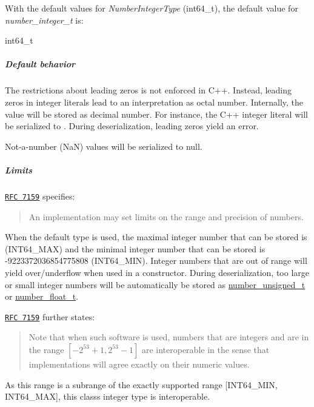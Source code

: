 With the default values for {\itshape Number\+Integer\+Type} ({\ttfamily int64\+\_\+t}), the default value for {\itshape number\+\_\+integer\+\_\+t} is\+:


\begin{DoxyCode}
int64\_t
\end{DoxyCode}


\subparagraph*{Default behavior}


\begin{DoxyItemize}
\item The restrictions about leading zeros is not enforced in C++. Instead, leading zeros in integer literals lead to an interpretation as octal number. Internally, the value will be stored as decimal number. For instance, the C++ integer literal {} will be serialized to {}. During deserialization, leading zeros yield an error.
\item Not-\/a-\/number (NaN) values will be serialized to {\ttfamily null}.
\end{DoxyItemize}

\subparagraph*{Limits}

\href{http://rfc7159.net/rfc7159}{\tt R\+FC 7159} specifies\+: \begin{quote}
An implementation may set limits on the range and precision of numbers. \end{quote}


When the default type is used, the maximal integer number that can be stored is {} (I\+N\+T64\+\_\+\+M\+AX) and the minimal integer number that can be stored is {\ttfamily -\/9223372036854775808} (I\+N\+T64\+\_\+\+M\+IN). Integer numbers that are out of range will yield over/underflow when used in a constructor. During deserialization, too large or small integer numbers will be automatically be stored as \hyperlink{a00025_a60a04166c122072ab11eaf9845d9cd1d}{number\+\_\+unsigned\+\_\+t} or \hyperlink{a00025_a74a0013e847fdc574b48f931f0e757e1}{number\+\_\+float\+\_\+t}.

\href{http://rfc7159.net/rfc7159}{\tt R\+FC 7159} further states\+: \begin{quote}
Note that when such software is used, numbers that are integers and are in the range $[-2^{53}+1, 2^{53}-1]$ are interoperable in the sense that implementations will agree exactly on their numeric values. \end{quote}


As this range is a subrange of the exactly supported range \mbox{[}I\+N\+T64\+\_\+\+M\+IN, I\+N\+T64\+\_\+\+M\+AX\mbox{]}, this class\textquotesingle{}s integer type is interoperable.

